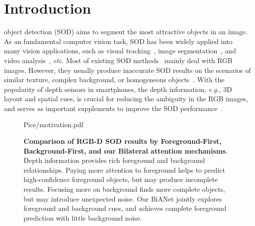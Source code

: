 \documentclass[journal]{IEEEtran}
\def\eg{\emph{e.g.}}
\begin{document}
\IEEEpeerreviewmaketitle



\section{Introduction}
\label{sec:intro}
 object detection (SOD) aims to segment the most attractive objects in an image.
As an fundamental computer vision task, SOD has been widely applied into many vision applications, such as visual tracking~\cite{li2019gradnet,mahadevan2009saliency}, image segmentation~\cite{hou2018nips,jung2011unified,tsai2018image}, and video analysis~\cite{zhang2017study,RANet2019}, \textsl{etc}.
Most of existing SOD methods~\cite{jiang2019super,liu2019deep,zhang2020multistage} mainly deal with RGB images.
However, they usually produce inaccurate SOD results on the scenarios of similar texture, complex background, or homogeneous objects~\cite{wang2019focal,zhang2019salient}.
With the popularity of depth sensors in smartphones, the depth information, \eg, 3D layout and spatial cues, is crucial for reducing the ambiguity in the RGB images, and serves as important supplements to improve the SOD performance~\cite{liang2012depth}.


\begin{figure}[t]
	\centering
	\begin{overpic}[width=1\columnwidth]{Pics/motivation.pdf} 
	\end{overpic}
	\vspace{-8mm}
	\caption{
	\textbf{Comparison of RGB-D SOD results by Foreground-First, Background-First, and our Bilateral attention mechanisms}.
Depth information provides rich foreground and background relationships.
Paying more attention to foreground helps to predict high-confidence foreground objects, but may produce incomplete results.
Focusing more on background finds more complete objects, but may introduce unexpected noise.
Our BiANet jointly explores foreground and background cues, and achieves complete foreground prediction with little background noise.
	}
	\vspace{-8pt}
	\label{fig:Motivation}
\end{figure}
\end{document}
